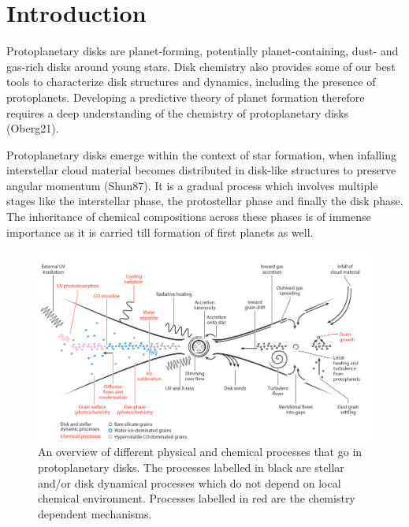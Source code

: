 \chapter{Introduction}
Protoplanetary disks are planet-forming, potentially planet-containing, dust- and gas-rich disks around young stars. Disk chemistry also provides some of our best tools to characterize disk structures and dynamics, including the presence of protoplanets. Developing a predictive theory of planet formation therefore requires a deep understanding of the chemistry of protoplanetary disks (Oberg21).

Protoplanetary disks emerge within the context of star formation, when infalling interstellar cloud material becomes distributed in disk-like structures to preserve angular momentum (Shun87). It is a gradual process which involves multiple stages like the interstellar phase, the protostellar phase and finally the disk phase. The inheritance of chemical compositions across these phases is of immense importance as it is carried till formation of first planets as well.




\begin{figure}
	\centering
	\includegraphics[angle=90, width=0.8\linewidth]{screenshot002}
	\caption{An overview of different physical and chemical processes that go in
	protoplanetary disks. The processes labelled in black are stellar and/or disk
	dynamical processes which do not depend on local chemical environment. Processes
	labelled in red are the chemistry dependent mechanisms.}
	\label{fig:screenshot002}
\end{figure}

